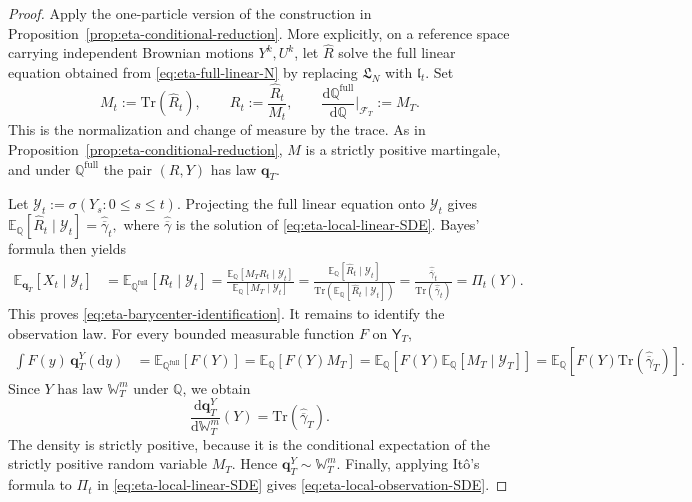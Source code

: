 \documentclass[10pt,a4paper,reqno]{amsart}
\numberwithin{equation}{section}
\theoremstyle{plain}
\theoremstyle{definition}
\theoremstyle{remark}
\renewcommand{\d}{\mathrm d}
\newcommand{\Tr}{\mathrm{Tr}}
\newcommand{\E}{\mathbb E}
\newcommand{\Q}{\mathbb Q}
\newcommand{\cF}{\mathcal F}
\newcommand{\cY}{\mathcal Y}
\newcommand{\1}{\mathbf 1}
\begin{document}
\begin{proof}
Apply the one-particle version of the construction in
Proposition~\ref{prop:eta-conditional-reduction}.  More explicitly, on a
reference space carrying independent Brownian motions \(Y^k,U^k\), let
\(\widehat R\) solve the full linear equation obtained from
\eqref{eq:eta-full-linear-N} by replacing \(\mathfrak L_N\) with
\(\mathfrak l_t\).  Set
\[
  M_t:=\Tr(\widehat R_t),
  \qquad
  R_t:=\frac{\widehat R_t}{M_t},
  \qquad
  \frac{\d\Q^{\mathrm{full}}}{\d\Q}\bigg|_{\cF_T}:=M_T .
\]
This is the normalization and change of measure by the trace.  As in
Proposition~\ref{prop:eta-conditional-reduction}, \(M\) is a strictly positive
martingale, and under \(\Q^{\mathrm{full}}\) the pair \((R,Y)\) has law
\(\mathbf q_T\).

Let
\(
  \cY_t:=\sigma(Y_s:0\le s\le t).
\)
Projecting the full linear equation onto \(\cY_t\) gives
\(
  \E_{\Q}[\widehat R_t\mid\cY_t]
  =
  \widehat{\overline\gamma}_t,
\)
where \(\widehat{\overline\gamma}\) is the solution of
\eqref{eq:eta-local-linear-SDE}.  Bayes' formula then yields
\[
\begin{aligned}
  \E_{\mathbf q_T}[X_t\mid\cY_t]
  &=
  \E_{\Q^{\mathrm{full}}}[R_t\mid\cY_t]  =
  \frac{
    \E_{\Q}[M_T R_t\mid\cY_t]
  }{
    \E_{\Q}[M_T\mid\cY_t]
  }
  =
  \frac{
    \E_{\Q}[\widehat R_t\mid\cY_t]
  }{
    \Tr\left(\E_{\Q}[\widehat R_t\mid\cY_t]\right)
  }
  =
  \frac{\widehat{\overline\gamma}_t}
       {\Tr(\widehat{\overline\gamma}_t)}
  =
  \Pi_t(Y).
\end{aligned}
\]
This proves \eqref{eq:eta-barycenter-identification}.  It remains to identify the observation law.  For every bounded measurable
function \(F\) on \(\mathsf Y_T\),
\[
\begin{aligned}
  \int F(y)\,\mathbf q_T^Y(\d y)
  &=
  \E_{\Q^{\mathrm{full}}}[F(Y)]
  =
  \E_{\Q}[F(Y)M_T]  =
  \E_{\Q}
  \left[
    F(Y)\E_{\Q}[M_T\mid\cY_T]
  \right]
  =
  \E_{\Q}
  \left[
    F(Y)\Tr(\widehat{\overline\gamma}_T)
  \right].
\end{aligned}
\]
Since \(Y\) has law \(\mathbb W_T^m\) under \(\Q\), we obtain
\[
  \frac{\d\mathbf q_T^Y}{\d\mathbb W_T^m}(Y)
  =
  \Tr(\widehat{\overline\gamma}_T).
\]
The density is strictly positive, because it is the conditional expectation of
the strictly positive random variable \(M_T\).  Hence
\(\mathbf q_T^Y\sim\mathbb W_T^m\).  Finally, applying It\^o's formula to
\(
  \Pi_t
\)
in \eqref{eq:eta-local-linear-SDE} gives
\eqref{eq:eta-local-observation-SDE}.
\end{proof}
\end{document}
